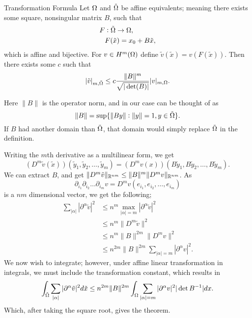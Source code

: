 \begin{thmx}{Transformation Formula\label{thm:transformation}}
    Let $\Omega$ and $\tilde{\Omega}$ be affine equivalents; meaning 
    there exists some square, nonsingular matrix $B$, such that 
    \begin{align*}
        F&: \tilde{\Omega}\to \Omega, \\
        & F(\tilde{x}) = x_0 + B\tilde{x},
    \end{align*}
    which is affine and bijective. For $v\in H^m(\Omega)$ define 
    $\tilde{v}(\tilde{x}) = v(F(\tilde{x}))$.
    Then there exists some $c$ such that 
    \begin{equation*}
        |\tilde{v}|_{m,\tilde{\Omega}} \leq 
        c \frac{\|B\|^m }{\sqrt{|\det(B)|}}|v|_{m,\Omega}.
    \end{equation*}
\end{thmx}
Here $\|B\|$ is the operator norm, and in our case can be thought of 
as 
\begin{equation*}
    \|B\| = \sup\{ \| By\| :\|y\| = 1, y \in \tilde{\Omega} \}.
\end{equation*}
If $B$ had another domain than $\tilde{\Omega}$, that domain would simply 
replace $\tilde{\Omega}$ in the definition.
\begin{bev}
   Writing the $m$th derivative as a multilinear form, we get 
   \begin{equation*}
    (D^m\tilde{v}(\tilde{x}))(\tilde{y}_1, \tilde{y}_2, \ldots, \tilde{y}_m )=
    (D^m v(x))(B\tilde{y}_1, B\tilde{y}_2, \ldots, B\tilde{y}_m ).
   \end{equation*} 
We can extract $B$, and get $\|D^m \tilde{v}\|_{\mathbb{R}^{nm}} \leq \|B\|^m \|D^m v\|_{\mathbb{R}^{nm}}$.
As 
\[\partial_{i_{1}}\partial_{i_{2}}\ldots \partial_{i_{m}} v = D^m v(e_{i_1},e_{i_2}, \ldots, e_{i_m})\]
is a $nm$ dimensional vector, we get the following;
\begin{align*}
    \sum_{|\alpha|} | \partial ^\alpha \tilde{v} |^2 & \leq n^m \max_{|\alpha|=m} |\partial ^\alpha \tilde{v}|^2 \\
    &\leq n^m \|D^m\tilde{v}\|^2 \\
    &\leq n^m \|B\|^{2m}\|D^m v\|^2 \\
    &\leq n^{2m}\|B\|^{2m} \sum_{|\alpha|=m}|\partial ^\alpha v|^2.
\end{align*}
We now wish to integrate; however, under affine linear transformation in integrals, 
we must include the transformation constant, which results in 
\begin{equation*}
    \int_{\tilde{\Omega}} \sum_{|\alpha|} | \partial ^\alpha \tilde{v} |^2 d\tilde{x}
    \leq n^{2m}\|B\|^{2m}\int_{\Omega} \sum_{|\alpha|=m}|\partial ^\alpha v|^2 |\det B^{-1}| dx.
\end{equation*}
Which, after taking the square root, gives the theorem.
\end{bev}